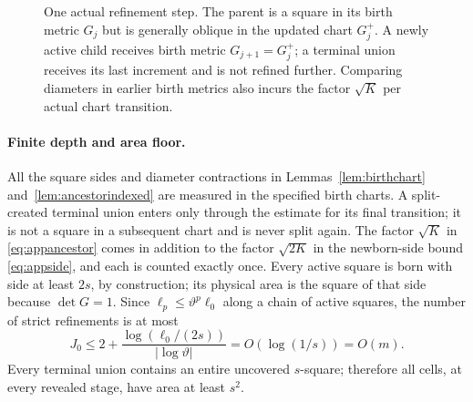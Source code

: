 \documentclass[11pt]{article}
\theoremstyle{definition}
\theoremstyle{remark}
\numberwithin{equation}{section}
\newcommand{\diam}{\operatorname{diam}}
\begin{document}
\begin{figure}[H]
\centering
{}
\caption{One actual refinement step. The parent is a square in its birth metric $G_j$ but is generally oblique in the updated chart $G_j^+$. A newly active child receives birth metric $G_{j+1}=G_j^+$; a terminal union receives its last increment and is not refined further. Comparing diameters in earlier birth metrics also incurs the factor $\sqrt K$ per actual chart transition.}
\label{fig:metric-refinement}
\end{figure}

\paragraph{Finite depth and area floor.}
All the square sides and diameter contractions in
Lemmas~\ref{lem:birthchart} and~\ref{lem:ancestorindexed} are measured
in the specified birth charts. A split-created terminal union enters
only through the estimate for its final transition; it is not a
square in a subsequent chart and is never split again. The factor
$\sqrt K$ in \eqref{eq:appancestor} comes in addition to the factor
$\sqrt{2K}$ in the newborn-side bound \eqref{eq:appside}, and each
is counted exactly once.
Every active square is born with side at least $2s$, by construction;
its physical area is the square of that side because $\det G=1$.
Since $\ell_p\le\vartheta^p\ell_0$ along a chain of active
squares, the number of strict refinements is at most
\[
 J_0\le 2+\frac{\log(\ell_0/(2s))}{|\log\vartheta|}
 =O(\log(1/s))=O(m).
\]
Every terminal union contains an entire uncovered $s$-square;
therefore all cells, at every revealed stage, have area at least $s^2$.
\end{document}
